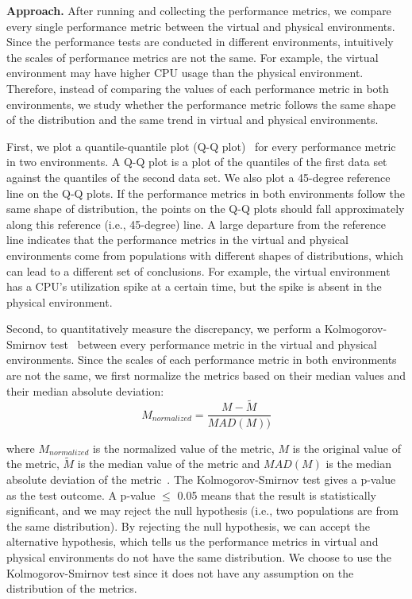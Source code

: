 \documentclass[smallextended]{svjour3}       %
\begin{document}
\noindent \textbf{Approach.} 
After running and collecting the performance metrics, we compare every single performance metric between the virtual and physical environments. Since the performance tests are conducted in different environments, intuitively the scales of performance metrics are not the same. For example, the virtual environment may have higher CPU usage than the physical environment. Therefore, instead of comparing the values of each performance metric in both environments, we study whether the performance metric follows the same shape of the distribution and the same trend in virtual and physical environments. 

First, we plot a quantile-quantile plot (Q-Q plot)~\cite{qqplots} for every performance metric in two environments. A Q-Q plot is a plot of the quantiles of the first data set against the quantiles of the second data set. We also plot a 45-degree reference line on the Q-Q plots. If the performance metrics in both environments follow the same shape of distribution, the points on the Q-Q plots should fall approximately along this reference (i.e., 45-degree) line. A large departure from the reference line indicates that the performance metrics in the virtual and physical environments come from populations with different shapes of distributions, which can lead to a different set of conclusions. For example, the virtual environment has a CPU's utilization spike at a certain time, but the spike is absent in the physical environment. 

Second, to quantitatively measure the discrepancy, we perform a Kolmogorov-Smirnov test~\cite{kstest} between every performance metric in the virtual and physical environments. Since the scales of each performance metric in both environments are not the same, we first normalize the metrics based on their median values and their median absolute deviation: 
\begin{equation}
\label{equ:mad}
M_{normalized}=\frac{M-\tilde{M}}{MAD(M))}		
\end{equation}

where $M_{normalized}$ is the normalized value of the metric, $M$ is the original value of the metric, $\tilde{M}$ is the median value of the metric and $MAD(M)$ is the median absolute deviation of the metric~\cite{walker1929studies}. The Kolmogorov-Smirnov test gives a p-value as the test outcome. A p-value $\leq$ 0.05 means that the result is statistically significant, and we may reject the null hypothesis (i.e., two populations are from the same distribution). By rejecting the null hypothesis, we can accept the alternative hypothesis, which tells us the performance metrics in virtual and physical environments do not have the same distribution. We choose to use the Kolmogorov-Smirnov test since it does not have any assumption on the distribution of the metrics.
\end{document}
